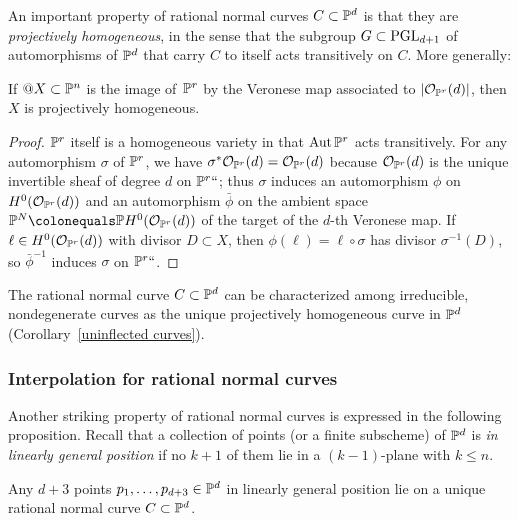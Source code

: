 An
important property of rational normal curves $C \subset {\mathbb P}^d$
is that they are \emph{projectively homogeneous},
in the sense that the
subgroup $G\subset\operatorname{PGL}_{d+1}$ of automorphisms of ${\mathbb P}^d$ that carry
$C$ to itself acts transitively on $C$. More generally: 
%

\begin{proposition}\label{Veronese is projectively homogeneous}
If $@X\subset {\mathbb P}^n$ is the image of $\kern1pt{\mathbb P}^r$ by the Veronese map 
%
associated
to $|{\mathcal O}_{{\mathbb P}^r}(d)|$, then $X$ is projectively homogeneous.
\unif
\end{proposition}

\begin{proof}
${\mathbb P}^r$ 
itself
is a homogeneous variety
in that $\operatorname{Aut} {\mathbb P}^r$ acts transitively. 
For any
automorphism 
$\sigma$ of ${\mathbb P}^r$, we have
$\sigma^*{\mathcal O}_{{\mathbb P}^r}(d) = {\mathcal O}_{{\mathbb P}^r}(d)$
because ${\mathcal O}_{{\mathbb P}^r}(d)$ is the unique
invertible sheaf of degree $d$ on ${\mathbb P}^r` `$;  
thus
$\sigma$ induces an automorphism $\phi$ on $H^0({\mathcal O}_{{\mathbb P}^r}(d))$ 
and an automorphism $\bar \phi$ on the ambient space 
$\PP^{N} \colonequals \PP H^0(\cO_{\PP^r}(d))$ of the target of the $d$-th Veronese map. If $\ell \in H^0({\mathcal O}_{{\mathbb P}^r}(d))$
 with divisor $D\subset X$, then $\phi(\ell) = \ell \circ \sigma$ has divisor $\sigma^{-1}(D)$, so $\bar\phi^{-1}$ induces $\sigma$ on ${\mathbb P}^r` `$. 
\unif
\end{proof}

The
rational normal curve
%
$C \subset {\mathbb P}^d$ can  be characterized among irreducible,
nondegenerate curves as the unique projectively homogeneous curve in
${\mathbb P}^d$ (Corollary~\ref{uninflected curves}).

\subsubsection*{%
Interpolation
for rational normal curves}
%

Another 
striking
property of rational normal curves is expressed in
the following 
proposition.
Recall that a collection of points (or a finite subscheme)
of ${\mathbb P}^d$ is 
\emph{in linearly general position} 
if no $k{+}1$ of them lie in a $(k{-}1)$-plane with $k\leq n$. 

\begin{proposition}\label{points on rnc}
%
Any $d+3$ points $p_1,\dots, p_{d+3} \in {\mathbb P}^d$ 
in linearly general position
lie on a unique rational normal curve $C \subset {\mathbb P}^d$.
\unif
 \end{proposition}

